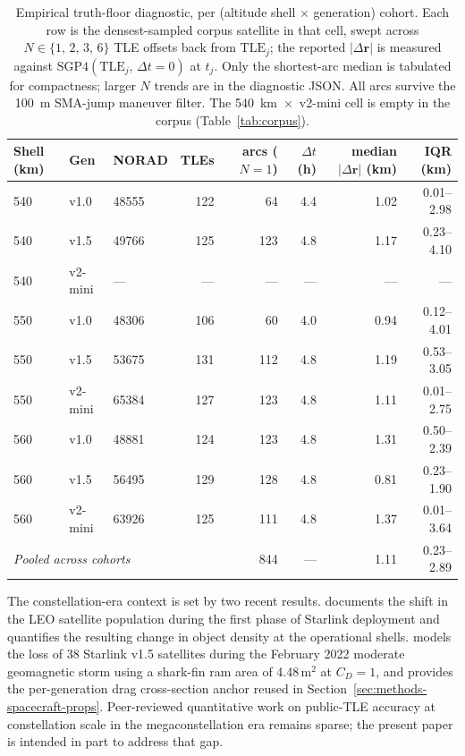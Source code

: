 \documentclass[10pt, letterpaper]{article}
\begin{document}
\begin{table}[ht]
  \centering
  \caption{Empirical truth-floor diagnostic, per (altitude shell
  $\times$ generation) cohort. Each row is the densest-sampled
  corpus satellite in that cell, swept across
  $N \in \{1,\,2,\,3,\,6\}$ TLE offsets back from $\mathrm{TLE}_{j}$;
  the reported $|\Delta\mathbf{r}|$ is measured against
  $\mathrm{SGP4}(\mathrm{TLE}_{j},\,\Delta t = 0)$ at $t_{j}$. Only
  the shortest-arc median is tabulated for compactness; larger $N$
  trends are in the diagnostic JSON. All arcs survive the 100~m
  SMA-jump maneuver filter. The 540~km~$\times$~v2-mini cell is empty
  in the corpus (Table~\ref{tab:corpus}).}
  \label{tab:truth-floor}
  \begin{tabular}{lllrrrrr}
    \toprule
    Shell (km) & Gen & NORAD & TLEs & arcs ($N\!=\!1$) & $\Delta t$ (h) & median $|\Delta\mathbf{r}|$ (km) & IQR (km) \\
    \midrule
    540 & v1.0    & 48555 & 122 &  64 &  4.4 & 1.02 & 0.01--2.98 \\
    540 & v1.5    & 49766 & 125 & 123 &  4.8 & 1.17 & 0.23--4.10 \\
    540 & v2-mini & ---   & --- & --- &  --- & ---  & --- \\
    550 & v1.0    & 48306 & 106 &  60 &  4.0 & 0.94 & 0.12--4.01 \\
    550 & v1.5    & 53675 & 131 & 112 &  4.8 & 1.19 & 0.53--3.05 \\
    550 & v2-mini & 65384 & 127 & 123 &  4.8 & 1.11 & 0.01--2.75 \\
    560 & v1.0    & 48881 & 124 & 123 &  4.8 & 1.31 & 0.50--2.39 \\
    560 & v1.5    & 56495 & 129 & 128 &  4.8 & 0.81 & 0.23--1.90 \\
    560 & v2-mini & 63926 & 125 & 111 &  4.8 & 1.37 & 0.01--3.64 \\
    \midrule
    \multicolumn{4}{l}{\textit{Pooled across cohorts}} & 844 & --- & 1.11 & 0.23--2.89 \\
    \bottomrule
  \end{tabular}
\end{table}

The constellation-era context is set by two recent results.
\citet{mcdowell2020} documents the shift in the LEO satellite
population during the first phase of Starlink deployment and
quantifies the resulting change in object density at the operational
shells. \citet{baruah2024} models the loss of 38 Starlink v1.5
satellites during the February 2022 moderate geomagnetic storm using
a shark-fin ram area of 4.48\,m$^{2}$ at $C_{D} = 1$, and provides the
per-generation drag cross-section anchor reused in
Section~\ref{sec:methods-spacecraft-props}. Peer-reviewed quantitative
work on public-TLE accuracy at constellation scale in the
megaconstellation era remains sparse; the present paper is intended
in part to address that gap.
\end{document}
